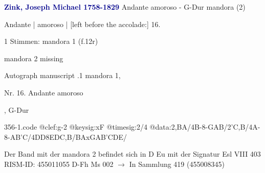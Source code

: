 \documentclass[twocolumn]{book}
\begin{document}
\newline \par \vspace{7pt} \textcolor{darkblue}{\textbf{Zink, Joseph Michael  1758-1829}}
\newline Andante amoroso - G-Dur
\newline mandora (2)
\newline \begin{itshape}[f.12r, at left:] Andante | amoroso | [left before the accolade:] 16.\end{itshape} 
\newline \textcolor{darkblue}{}  1 Stimmen: mandora 1  (f.12r)
\newline \begin{small} mandora 2 missing\end{small} 
\newline Autograph manuscript
.1  mandora 1, \begin{itshape}Nr. 16. Andante amoroso\end{itshape}, G-Dur  
\begin{filecontents*}{356-1.code}
@clef:g-2
@keysig:xF
@timesig:2/4
@data:2,BA/4B-8-GAB/2'C,B/4A-8-A{B'C}/4DD8EDC,B/BAxGA{B'C}DE/
\end{filecontents*}
\newline
%
\newline Der Band mit der mandora 2 befindet sich in D Eu mit der Signatur Esl VIII 403
\newline RISM-ID: 455011055
\newline D-Fh  Ms 002
\newline $\rightarrow$ In Sammlung 419 (455008345)
      
\end{document}

